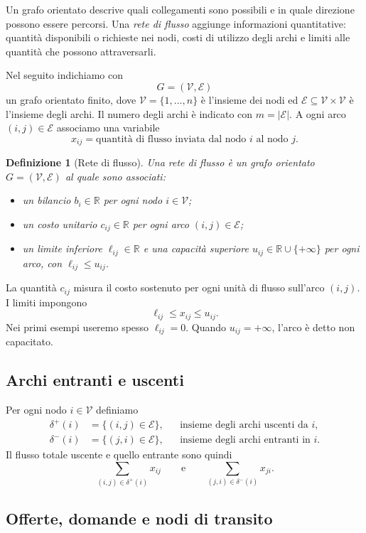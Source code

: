 \documentclass[11pt,a4paper]{article}
\newtheorem{definition}{Definizione}[section]
\newcommand{\R}{\mathbb{R}}
\newcommand{\V}{\mathcal{V}}
\newcommand{\E}{\mathcal{E}}
\newcommand{\deltaout}{\delta^{+}}
\newcommand{\deltain}{\delta^{-}}
\begin{document}
Un grafo orientato descrive quali collegamenti sono possibili e in quale direzione possono essere percorsi. Una \emph{rete di flusso} aggiunge informazioni quantitative: quantità disponibili o richieste nei nodi, costi di utilizzo degli archi e limiti alle quantità che possono attraversarli.

Nel seguito indichiamo con
\[
  G=(\V,\E)
\]
un grafo orientato finito, dove $\V=\{1,\ldots,n\}$ è l'insieme dei nodi ed $\E\subseteq \V\times\V$ è l'insieme degli archi. Il numero degli archi è indicato con $m=|\E|$. A ogni arco $(i,j)\in\E$ associamo una variabile
\[
  x_{ij}=\text{quantità di flusso inviata dal nodo $i$ al nodo $j$}.
\]

\begin{definition}[Rete di flusso]
Una rete di flusso è un grafo orientato $G=(\V,\E)$ al quale sono associati:
\begin{itemize}[nosep]
  \item un bilancio $b_i\in\R$ per ogni nodo $i\in\V$;
  \item un costo unitario $c_{ij}\in\R$ per ogni arco $(i,j)\in\E$;
  \item un limite inferiore $\ell_{ij}\in\R$ e una capacità superiore $u_{ij}\in\R\cup\{+\infty\}$ per ogni arco, con $\ell_{ij}\le u_{ij}$.
\end{itemize}
\end{definition}

La quantità $c_{ij}$ misura il costo sostenuto per ogni unità di flusso sull'arco $(i,j)$. I limiti impongono
\[
  \ell_{ij}\le x_{ij}\le u_{ij}.
\]
Nei primi esempi useremo spesso $\ell_{ij}=0$. Quando $u_{ij}=+\infty$, l'arco è detto non capacitato.

\subsection{Archi entranti e uscenti}

Per ogni nodo $i\in\V$ definiamo
\begin{align*}
  \deltaout(i)&=\{(i,j)\in\E\}, &&\text{insieme degli archi uscenti da $i$},\\
  \deltain(i)&=\{(j,i)\in\E\}, &&\text{insieme degli archi entranti in $i$}.
\end{align*}
Il flusso totale uscente e quello entrante sono quindi
\[
  \sum_{(i,j)\in\deltaout(i)}x_{ij}
  \qquad\text{e}\qquad
  \sum_{(j,i)\in\deltain(i)}x_{ji}.
\]

\subsection{Offerte, domande e nodi di transito}
\end{document}
